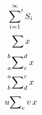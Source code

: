 \documentclass{article}
\begin{document}
\[ \sideset{}{'}\sum_{i=1}^\infty S_i \]
\[  \sideset{}{}{\sum} x\]
\[  \sideset{_a^b}{_c^d}{\sum} x\]
\[  \sideset{^a_b}{^c_d}{\sum} x\]
\[  \sideset{u}{_ev}{\sum} x\]
\end{document}
